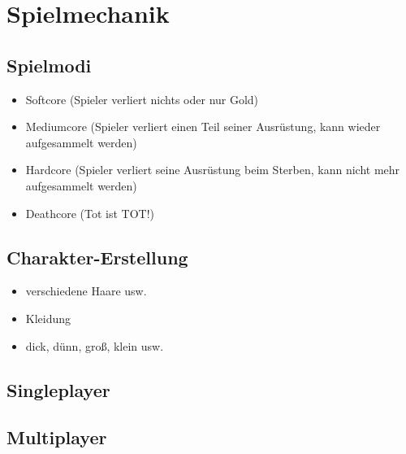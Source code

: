 \section{Spielmechanik}
\label{sec:spielmechanik}

\subsection{Spielmodi}
\label{subsec:spielmodi}
	\begin{itemize}
		\item Softcore (Spieler verliert nichts oder nur Gold)
		\item Mediumcore (Spieler verliert einen Teil seiner Ausrüstung, kann wieder aufgesammelt werden)
		\item Hardcore (Spieler verliert seine Ausrüstung beim Sterben, kann nicht mehr aufgesammelt werden)
		\item Deathcore (Tot ist TOT!)
	\end{itemize}


\subsection{Charakter-Erstellung}
\label{subsec:charakter-erstellung}
	\begin{itemize}
		\item verschiedene Haare usw.
		\item Kleidung
		\item dick, dünn, groß, klein usw.
	\end{itemize}

\subsection{Singleplayer}
\label{subsec:singleplayer}

\subsection{Multiplayer}
\label{subsec:multiplayer}


